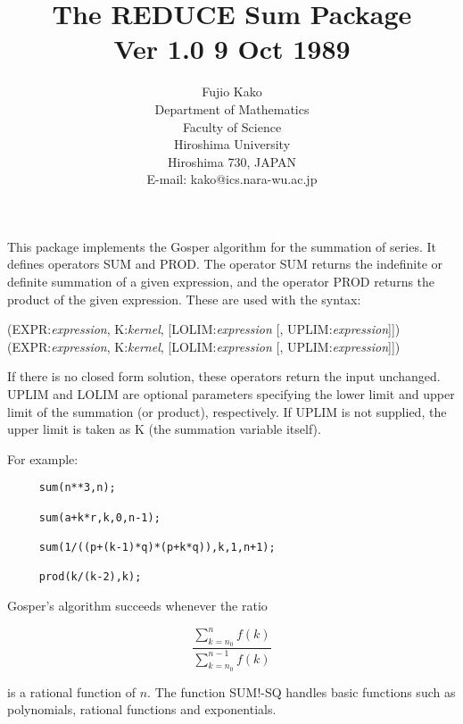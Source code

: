 \title{The REDUCE Sum Package \\ Ver 1.0 9 Oct 1989}
\date{}
\author{Fujio Kako \\ Department of Mathematics \\ Faculty of Science \\
Hiroshima University \\ Hiroshima 730, JAPAN \\
E-mail: kako@ics.nara-wu.ac.jp}

\maketitle
{}  
This package implements the Gosper algorithm for the summation of series.
It defines operators SUM and PROD.  The operator SUM returns the indefinite
or definite summation of a given expression, and the operator PROD returns
the product of the given expression.  These are used with the syntax:

\vspace{.1in}
(EXPR:{\em expression}, K:{\em kernel},
[LOLIM:{\em expression} [, UPLIM:{\em expression}]])
\vspace{.1in}
(EXPR:{\em expression}, K:{\em kernel},
[LOLIM:{\em expression} [, UPLIM:{\em expression}]])

If there is no closed form solution, these operators return the input
unchanged.  UPLIM and LOLIM are optional parameters specifying the lower
limit and upper limit of the summation (or product), respectively.  If UPLIM
is not supplied, the upper limit is taken as K (the summation variable
itself).

For example:

\begin{verbatim}
     sum(n**3,n);

     sum(a+k*r,k,0,n-1);

     sum(1/((p+(k-1)*q)*(p+k*q)),k,1,n+1);

     prod(k/(k-2),k);
\end{verbatim}

Gosper's algorithm succeeds whenever the ratio

\[ \frac{\sum_{k=n_0}^n f(k)}{\sum_{k=n_0}^{n-1} f(k)} \]

\noindent is a rational function of $n$.  The function SUM!-SQ
handles basic functions such as polynomials, rational functions and
exponentials. 

